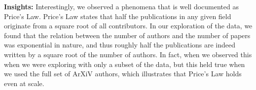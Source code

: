 \documentclass{article}
\begin{document}
\textbf{Insights:} Interestingly, we observed a phenomena that is well documented as Price's Law. Price's Law states that half the publications in any given field originate from a square root of all contributors. In our exploration of the data, we found that the relation between the number of authors and the number of papers was exponential in nature, and thus roughly half the publications are indeed written by a square root of the number of authors. In fact, when we observed this when we were exploring with only a subset of the data, but this held true when we used the full set of ArXiV authors, which illustrates that Price's Law holds even at scale. 
\end{document}
